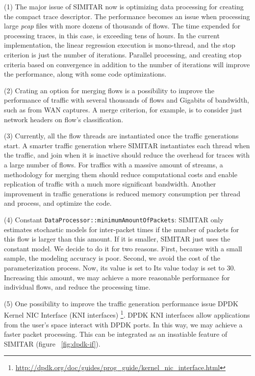 (1) The major issue of SIMITAR now is optimizing data processing for creating the compact trace descriptor. The performance becomes an issue when processing large \textit{pcap} files with more dozens of thousands of flows. The time expended for processing traces, in this case, is exceeding tens of hours. In the current implementation, the linear regression execution is mono-thread, and the stop criterion is just the number of iterations. Parallel processing, and creating stop criteria based on convergence in addition to the number of iterations will improve the performance, along with some code optimizations.

(2) Crating an option for merging flows is a possibility to improve the performance of traffic with several thousands of flows and Gigabits of bandwidth, such as from WAN captures. A merge criterion, for example, is to consider just network headers on flow's classification.


(3) Currently, all the flow threads are instantiated once the traffic generations start. A smarter traffic generation where SIMITAR instantiates each thread when the traffic, and join when it is inactive should reduce the overhead for traces with a large number of flows. For traffics with a massive amount of streams, a methodology for merging them should reduce computational costs and enable replication of traffic with a much more significant bandwidth. Another improvement in traffic generations is reduced memory consumption per thread and process, and optimize the code.


(4) Constant \texttt{DataProcessor::minimumAmountOfPackets}: SIMITAR only estimates stochastic models for inter-packet times if the number of packets for this flow is larger than this amount. If it is smaller, SIMITAR just uses the constant model. We decide to do it for two reasons. First, because with a small sample, the modeling accuracy is poor. Second, we avoid the cost of the parameterization process. Now, its value is set to Its value today is set to 30. Increasing this amount, we may achieve a more reasonable performance for individual flows, and reduce the processing time. 


(5) One possibility to improve the traffic generation performance issue DPDK Kernel NIC Interface  (KNI interfaces) \footnote{\href{http://dpdk.org/doc/guides/prog_guide/kernel_nic_interface.html}{http://dpdk.org/doc/guides/prog\_guide/kernel\_nic\_interface.html}}. DPDK KNI interfaces allow applications from the user's space interact with DPDK ports. In this way, we may achieve a faster packet processing. This can be integrated as an insatiable feature of SIMITAR (figure ~\ref{fig:dpdk-if}).


